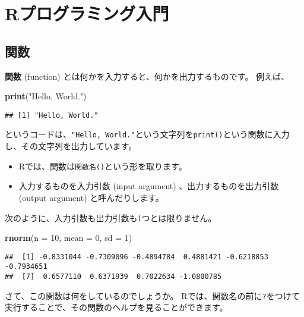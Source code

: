 \documentclass[]{bxjsarticle}
\newenvironment{Shaded}{\begin{snugshade}}{\end{snugshade}}
\newcommand{\DataTypeTok}[1]{\textcolor[rgb]{0.13,0.29,0.53}{#1}}
\newcommand{\DecValTok}[1]{\textcolor[rgb]{0.00,0.00,0.81}{#1}}
\newcommand{\KeywordTok}[1]{\textcolor[rgb]{0.13,0.29,0.53}{\textbf{#1}}}
\newcommand{\NormalTok}[1]{#1}
\newcommand{\StringTok}[1]{\textcolor[rgb]{0.31,0.60,0.02}{#1}}
\providecommand{\tightlist}{%
  \setlength{\itemsep}{0pt}\setlength{\parskip}{0pt}}
\begin{document}
\hypertarget{intro-r}{%
\section{Rプログラミング入門}\label{intro-r}}

\hypertarget{ux95a2ux6570}{%
\subsection{関数}\label{ux95a2ux6570}}

\textbf{関数} (function) とは何かを入力すると、何かを出力するものです。
例えば、

\begin{Shaded}
\begin{Highlighting}[]
\KeywordTok{print}\NormalTok{(}\StringTok{"Hello, World."}\NormalTok{)}
\end{Highlighting}
\end{Shaded}

\begin{verbatim}
## [1] "Hello, World."
\end{verbatim}

というコードは、\texttt{"Hello,\ World."}という文字列を\texttt{print()}という関数に入力し、その文字列を出力しています。

\begin{itemize}
\tightlist
\item
  Rでは、関数は\texttt{関数名()}という形を取ります。
\item
  入力するものを入力引数 (input argument) 、出力するものを出力引数 (output argument) と呼んだりします。
\end{itemize}

次のように、入力引数も出力引数も1つとは限りません。

\begin{Shaded}
\begin{Highlighting}[]
\KeywordTok{rnorm}\NormalTok{(}\DataTypeTok{n =} \DecValTok{10}\NormalTok{, }\DataTypeTok{mean =} \DecValTok{0}\NormalTok{, }\DataTypeTok{sd =} \DecValTok{1}\NormalTok{)}
\end{Highlighting}
\end{Shaded}

\begin{verbatim}
##  [1] -0.8331044 -0.7309096 -0.4894784  0.4881421 -0.6218853 -0.7934651
##  [7]  0.6577110  0.6371939  0.7022634 -1.0800785
\end{verbatim}

さて、この関数は何をしているのでしょうか。
Rでは、関数名の前に\texttt{?}をつけて実行することで、その関数のヘルプを見ることができます。
\end{document}
